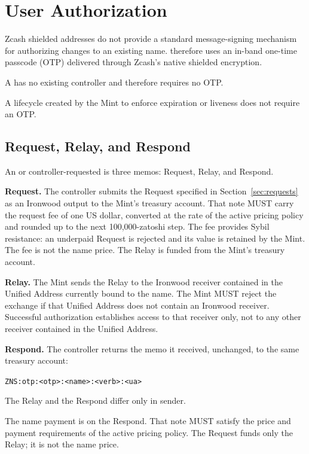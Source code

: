 \section{User Authorization}
\label{sec:authorization}

Zcash shielded addresses do not provide a standard message-signing mechanism for authorizing changes to an existing name. \zns{} therefore uses an in-band one-time passcode (OTP) delivered through Zcash's native shielded encryption.

A  has no existing controller and therefore requires no OTP.

A lifecycle  created by the Mint to enforce expiration or liveness does not require an OTP.

\subsection{Request, Relay, and Respond}

An  or controller-requested  is three memos: Request, Relay, and Respond.

\textbf{Request.} The controller submits the Request specified in Section~\ref{sec:requests} as an Ironwood output to the Mint's treasury account. That note MUST carry the request fee of one US dollar, converted at the rate of the active pricing policy and rounded up to the next 100{,}000-zatoshi step. The fee provides Sybil resistance: an underpaid Request is rejected and its value is retained by the Mint. The fee is not the name price. The Relay is funded from the Mint's treasury account.

\textbf{Relay.} The Mint sends the Relay to the Ironwood receiver contained in the Unified Address currently bound to the name. The Mint MUST reject the exchange if that Unified Address does not contain an Ironwood receiver. Successful authorization establishes access to that receiver only, not to any other receiver contained in the Unified Address.

\textbf{Respond.} The controller returns the memo it received, unchanged, to the same treasury account:

\begin{center}
\texttt{ZNS:otp:<otp>:<name>:<verb>:<ua>}
\end{center}

The Relay and the Respond differ only in sender.

The name payment is on the Respond. That note MUST satisfy the price and payment requirements of the active pricing policy. The Request funds only the Relay; it is not the name price.

